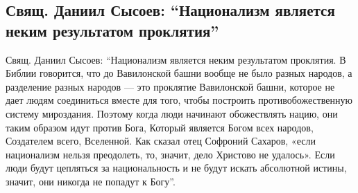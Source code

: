  
 
 

\subsection{Свящ. Даниил Сысоев: \enquote{Национализм является неким результатом проклятия}}
\label{sec:20_11_2020.fb.gregory_simonenko.1.daniil_sysoev_nazionalizm}

Свящ. Даниил Сысоев: \enquote{Национализм является неким результатом проклятия. В
Библии говорится, что до Вавилонской башни вообще не было разных народов, а
разделение разных народов --- это проклятие Вавилонской башни, которое не дает
людям соединиться вместе для того, чтобы построить противобожественную систему
мироздания. Поэтому когда люди начинают обожествлять нацию, они таким образом
идут против Бога, Который является Богом всех народов, Создателем всего,
Вселенной. Как сказал отец Софроний Сахаров, «если национализм нельзя
преодолеть, то, значит, дело Христово не удалось». Если люди будут цепляться за
национальность и не будут искать абсолютной истины, значит, они никогда не
попадут к Богу}.
